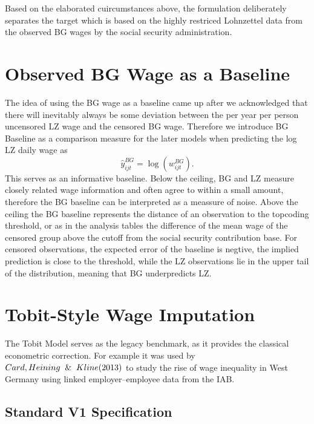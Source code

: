 \documentclass[12pt,a4paper,oneside,titlepage]{book}
\newif\ifthesisdraft
\newcommand{\draftnote}[1]{%
  \ifthesisdraft
    \par\noindent\colorbox{yellow!20}{%
      \parbox{0.94\textwidth}{\textbf{Draft note:} #1}%
    }\par
  \fi
}
\begin{document}
Based on the elaborated cuircumstances above, the formulation deliberately separates the target which is based on the highly restriced Lohnzettel data from the observed BG wages by the social security administration.

\section{Observed BG Wage as a Baseline}

The idea of using the BG wage as a baseline came up after we acknowledged that there will inevitably always be some deviation between the per year per person uncensored LZ wage and the censored BG wage. Therefore we introduce BG Baseline as a comparison measure for the later models when predicting the log LZ daily wage as
\begin{equation}
  \widehat y^{BG}_{ijt}=\log(w^{BG}_{ijt}).
\end{equation}
This serves as an informative baseline. Below the ceiling, BG and LZ measure
closely related wage information and often agree to within a small amount, therefore the BG baseline can be interpreted as a meassure of noise. Above the ceiling the BG baseline represents the distance of an observation to the topcoding threshold, or as in the analysis tables the difference of the mean wage of the censored group above the cutoff from the social security contribution base. 
For censored observations, the expected error of the baseline is negtive, the implied prediction is close to the threshold, while the LZ observations lie in the upper tail of the distribution, meaning that BG underpredicts LZ. 

\section{Tobit-Style Wage Imputation}
\label{sec:tobit}

The Tobit Model serves as the legacy benchmark, as it provides the classical econometric correction. For example it was used by $Card, Heining \space \And \space Kline (2013)$ to study the rise of wage inequality in West Germany using linked employer–employee data from the IAB.

\subsection{Standard V1 Specification}
\draftnote{Present the classical Card-style specification and its assumptions. Document the interval-censored Gaussian model estimated with \texttt{survival::survreg}.}
\end{document}
